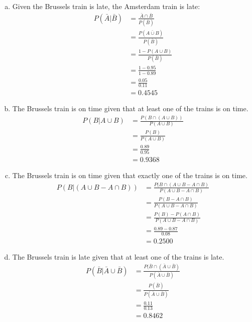 \documentclass{scrartcl}
\begin{document}
\begin{enumerate}
\begin{enumerate}[a)]
\item Given the Brussels train is late, the Amsterdam train is late:\\
\begin{align*}
P(\bar{A}|\bar{B}) &= \frac{\bar{A}\cap\bar{B}}{P(\bar{B})}\\
                   &= \frac{P(\bar{A \cup B})}{P(\bar{B})}\\
                   &= \frac{1 - P(A \cup B)}{P(\bar{B})}\\
                   &= \frac{1 - 0.95}{1 - 0.89}\\
                   &= \frac{0.05}{0.11}\\
                   &= 0.4545
\end{align*}

\item The Brussels train is on time given that at least one of the trains is on time.\\
\begin{align*}
P(B|A \cup B) &= \frac{P(B \cap (A \cup B))}{P(A \cup B)}\\
              &= \frac{P(B)}{P(A \cup B)}\\
              &= \frac{0.89}{0.95}\\
              &= 0.9368
\end{align*}
\pagebreak

\item The Brussels train is on time given that exactly one of the trains is on time.\\
\begin{align*}
P(B|(A \cup B - A \cap B)) &= \frac{P(B \cap (A \cup B - A \cap B)}{P(A \cup B - A \cap B)}\\
                           &= \frac{P(B - A \cap B)}{P(A \cup B - A \cap B)}\\
                           &= \frac{P(B)-P(A \cap B)}{P(A \cup B - A \cap B)}\\
                           &= \frac{0.89 - 0.87}{0.08}\\
                           &= 0.2500
\end{align*}

\item The Brussels train is late given that at least one of the trains is late.\\
\begin{align*}
P(\bar{B}|\bar{A}\cup\bar{B}) &= \frac{P(\bar{B}\cap(\bar{A}\cup\bar{B})}{P(\bar{A}\cup\bar{B})}\\
                               &= \frac{P(\bar{B})}{P(\bar{A}\cup\bar{B})}\\
                               &= \frac{0.11}{0.13}\\
                               &= 0.8462
\end{align*}


\end{enumerate}
\end{enumerate}
\end{document}
